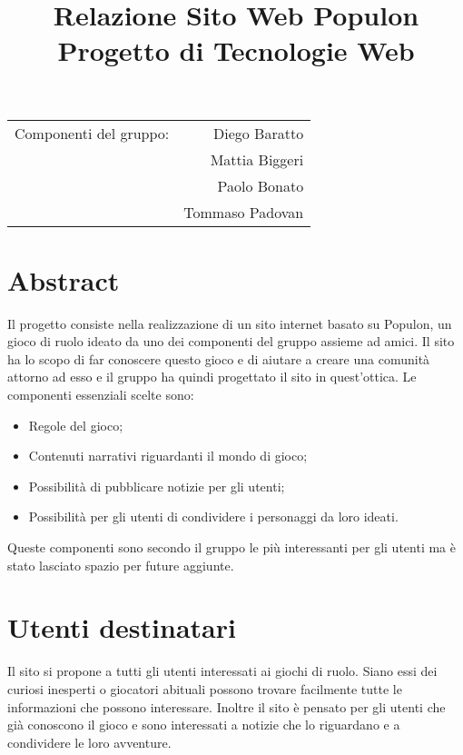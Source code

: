 \documentclass{article}
\title{Relazione Sito Web Populon \\ Progetto di Tecnologie Web} %
\begin{document}
\maketitle %

\begin{center}
\begin{tabular}{l r}
Componenti del gruppo: & Diego Baratto \\ %
& Mattia Biggeri \\
& Paolo Bonato \\
& Tommaso Padovan \\
\end{tabular}
\end{center}



\section{Abstract}
	Il progetto consiste nella realizzazione di un sito internet basato su Populon, un gioco di ruolo ideato da uno dei
	componenti del gruppo assieme ad amici. Il sito ha lo scopo di far conoscere questo gioco e di aiutare a creare una comunità
	attorno ad esso e il gruppo ha quindi progettato il sito in quest'ottica. Le componenti essenziali scelte sono:
	\begin{itemize}
		\item Regole del gioco;
		\item Contenuti narrativi riguardanti il mondo di gioco;
		\item Possibilità di pubblicare notizie per gli utenti;
		\item Possibilità per gli utenti di condividere i personaggi da loro ideati.	
	\end{itemize}
	Queste componenti sono secondo il gruppo le più interessanti per gli utenti ma è stato lasciato spazio per future aggiunte.
 

\section{Utenti destinatari}
	Il sito si propone a tutti gli utenti interessati ai giochi di ruolo. Siano essi dei curiosi inesperti o giocatori 
	abituali possono trovare facilmente tutte le informazioni che possono interessare. Inoltre il sito è pensato per gli
	utenti che già conoscono il gioco e sono interessati a notizie che lo riguardano e a condividere le loro avventure.
\end{document}
